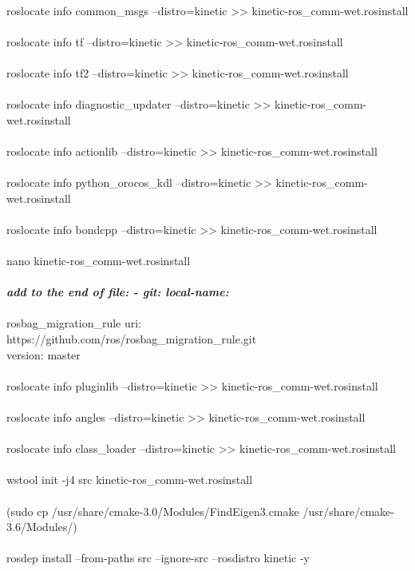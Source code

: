 \documentclass{report}
\begin{document}
\\
roslocate info common\_msgs --distro=kinetic >> kinetic-ros\_comm-wet.rosinstall \\
\\
roslocate info tf --distro=kinetic >> kinetic-ros\_comm-wet.rosinstall \\
\\
roslocate info tf2 --distro=kinetic >> kinetic-ros\_comm-wet.rosinstall \\
\\
roslocate info diagnostic\_updater --distro=kinetic >> kinetic-ros\_comm-wet.rosinstall \\
\\
roslocate info actionlib --distro=kinetic >> kinetic-ros\_comm-wet.rosinstall \\
\\
roslocate info python\_orocos\_kdl --distro=kinetic >> kinetic-ros\_comm-wet.rosinstall \\
\\
roslocate info bondcpp --distro=kinetic >> kinetic-ros\_comm-wet.rosinstall \\
\\
nano kinetic-ros\_comm-wet.rosinstall \\
\\
\textbf{\emph{add to the end of file: - git: local-name:}} \\
\\
rosbag\_migration\_rule uri: \\
https://github.com/ros/rosbag\_migration\_rule.git\\
version: master \\
\*
\\
roslocate info pluginlib --distro=kinetic >> kinetic-ros\_comm-wet.rosinstall \\
\\
roslocate info angles --distro=kinetic >> kinetic-ros\_comm-wet.rosinstall \\
\\
roslocate info class\_loader --distro=kinetic >> kinetic-ros\_comm-wet.rosinstall \\
\\
wstool init -j4 src kinetic-ros\_comm-wet.rosinstall \\
\\
(sudo cp /usr/share/cmake-3.0/Modules/FindEigen3.cmake /usr/share/cmake-3.6/Modules/) \\
\\
rosdep install --from-paths src --ignore-src --rosdistro kinetic -y \\
\end{document}
